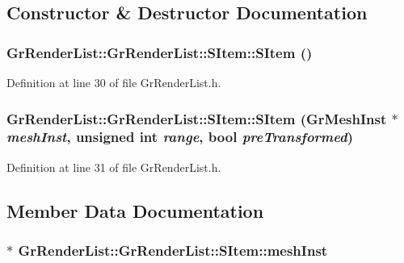 \subsection{Constructor \& Destructor Documentation}
\hypertarget{struct_gr_render_list_1_1_s_item_cc6a5a62dad35a7fc0a38ad8e9f20ce2}{
\subsubsection[{SItem}]{\setlength{\rightskip}{0pt plus 5cm}GrRenderList::GrRenderList::SItem::SItem ()}}
\label{struct_gr_render_list_1_1_s_item_cc6a5a62dad35a7fc0a38ad8e9f20ce2}




Definition at line 30 of file GrRenderList.h.\hypertarget{struct_gr_render_list_1_1_s_item_f136fee108179689dec2fb5ba57ae38e}{
\subsubsection[{SItem}]{\setlength{\rightskip}{0pt plus 5cm}GrRenderList::GrRenderList::SItem::SItem ({\bf GrMeshInst} $\ast$ {\em meshInst}, \/  unsigned int {\em range}, \/  bool {\em preTransformed})}}
\label{struct_gr_render_list_1_1_s_item_f136fee108179689dec2fb5ba57ae38e}




Definition at line 31 of file GrRenderList.h.

\subsection{Member Data Documentation}
\hypertarget{struct_gr_render_list_1_1_s_item_d6ed05f00aea8fb71dfae70328e77bb8}{
\subsubsection[{meshInst}]{$\ast$ GrRenderList::GrRenderList::SItem::meshInst}}
\label{struct_gr_render_list_1_1_s_item_d6ed05f00aea8fb71dfae70328e77bb8}




